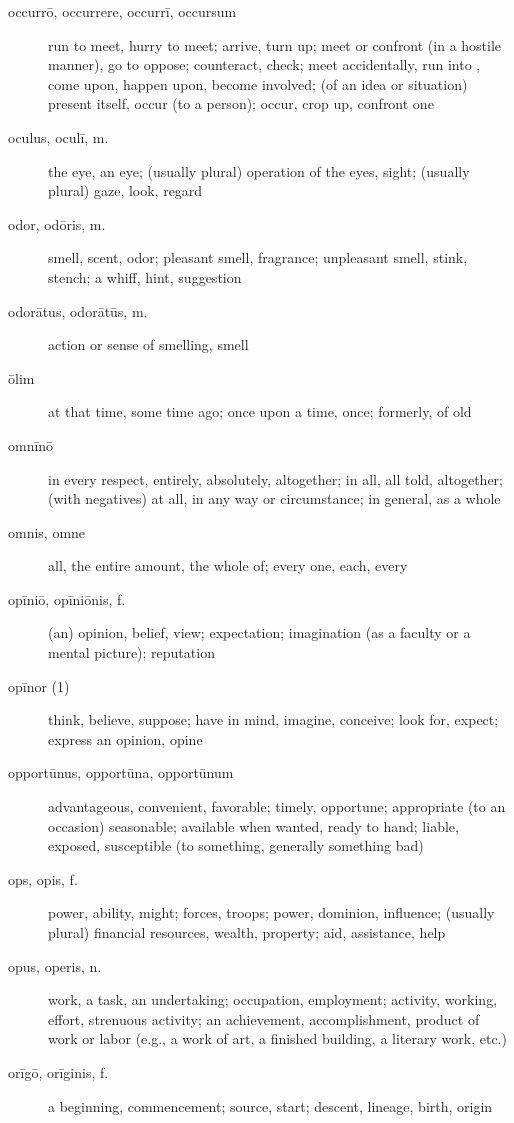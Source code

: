 \begin{description}
    \item[occurrō, occurrere, occurrī, occursum] \marginnote{*}run to meet, hurry to meet; arrive, turn up; meet or confront (in a hostile manner), go to oppose; counteract, check; meet accidentally, run into , come upon, happen upon, become involved; (of an idea or situation) present itself, occur (to a person); occur, crop up, confront one
    \item[oculus, oculī, m.] \marginnote{*}the eye, an eye; (usually plural) operation of the eyes, sight; (usually plural) gaze, look, regard
    \item[odor, odōris, m.] smell, scent, odor; pleasant smell, fragrance; unpleasant smell, stink, stench; a whiff, hint, suggestion
    \item[odorātus, odorātūs, m.] action or sense of smelling, smell
    \item[ōlim] \marginnote{*}at that time, some time ago; once upon a time, once; formerly, of old
    \item[omnīnō] in every respect, entirely, absolutely, altogether; in all, all told, altogether; (with negatives) at all, in any way or circumstance; in general, as a whole
    \item[omnis, omne] \marginnote{*}all, the entire amount, the whole of; every one, each, every
    \item[opīniō, opīniōnis, f.] (an) opinion, belief, view; expectation; imagination (as a faculty or a mental picture); reputation
    \item[opīnor (1)] think, believe, suppose; have in mind, imagine, conceive; look for, expect; express an opinion, opine
    \item[opportūnus, opportūna, opportūnum] advantageous, convenient, favorable; timely, opportune; appropriate (to an occasion) seasonable; available when wanted, ready to hand; liable, exposed, susceptible (to something, generally something bad)
    \item[ops, opis, f.] \marginnote{*}power, ability, might; forces, troops; power, dominion, influence; (usually plural) financial resources, wealth, property; aid, assistance, help
    \item[opus, operis, n.] \marginnote{*}work, a task, an undertaking; occupation, employment; activity, working, effort, strenuous activity; an achievement, accomplishment, product of work or labor (e.g., a work of art, a finished building, a literary work, etc.)
    \item[orīgō, orīginis, f.] a beginning, commencement; source, start; descent, lineage, birth, origin

\end{description}
